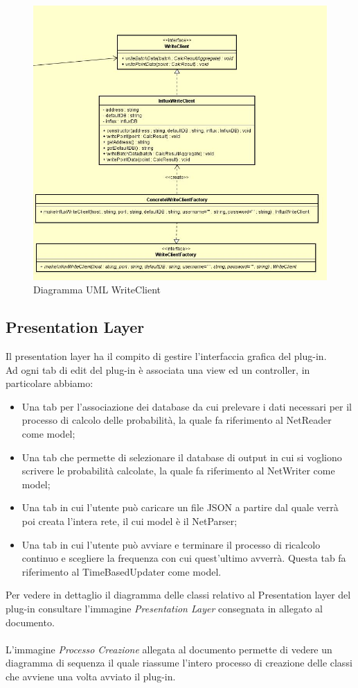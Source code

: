 \begin{figure} [H]
	\centering
	\includegraphics[scale=0.5]{Img/WriteClient}
	\caption{Diagramma UML WriteClient}\label{}
\end{figure}
\subsection{Presentation Layer}
Il presentation layer ha il compito di gestire l'interfaccia grafica del plug-in.\\
Ad ogni tab di edit del plug-in è associata una view ed un controller, in particolare abbiamo:
\begin{itemize}
	\item Una tab per l’associazione dei database da cui prelevare i dati necessari per il processo di calcolo delle probabilità, la quale fa riferimento al NetReader come model;
	\item Una tab che permette di selezionare il database di output in cui si vogliono scrivere le probabilità calcolate, la quale fa riferimento al NetWriter come model;
	\item Una tab in cui l'utente può caricare un file JSON a partire dal quale verrà poi creata l'intera rete, il cui model è il NetParser;
	\item Una tab in cui l'utente può avviare e terminare il processo di ricalcolo continuo e scegliere la frequenza con cui quest'ultimo avverrà. Questa tab fa riferimento al TimeBasedUpdater come model.
\end{itemize}
Per vedere in dettaglio il diagramma delle classi relativo al Presentation layer del plug-in consultare l'immagine \emph{Presentation Layer} consegnata in allegato al documento.\\
\\
L'immagine \emph{Processo Creazione} allegata al documento permette di vedere un diagramma di sequenza il quale riassume l'intero processo di creazione delle classi che avviene una volta avviato il plug-in.
\pagebreak

